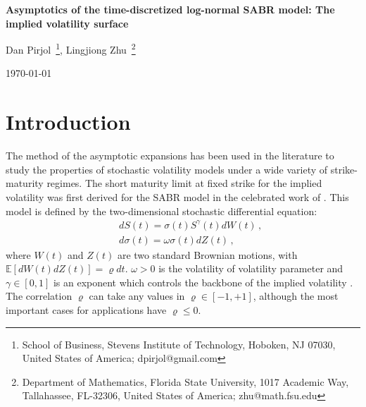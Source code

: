 \documentclass[11pt]{article}
\numberwithin{equation}{section}
\theoremstyle{plain}
\begin{document}
\begin{center}
  \Large \bf Asymptotics of the time-discretized log-normal SABR model:
The implied volatility surface
\end{center}

\author{}
\begin{center}
Dan Pirjol\,
\footnote{School of Business, Stevens Institute of Technology, Hoboken, NJ 07030, United States of America; dpirjol@gmail.com},
Lingjiong Zhu\,
\footnote{Department of Mathematics, Florida State University, 1017 Academic Way, Tallahassee, FL-32306, United States of America; zhu@math.fsu.edu}
\end{center}

\begin{center}
 \today
\end{center}

\begin{abstract}
We propose a novel time discretization for the log-normal SABR model
which is a popular stochastic volatility model that is 
widely used in financial practice. Our time discretization is a variant of the 
Euler-Maruyama scheme. We study its asymptotic
properties in the limit of a large number of time steps under a certain asymptotic regime
which includes the case of finite maturity, small vol-of-vol and large initial volatility
with fixed product of vol-of-vol and initial volatility.
We derive an almost sure limit and a large deviations result for the log-asset 
price in the limit of large number of time steps. We derive an exact
representation of the implied volatility surface for
\textit{arbitrary maturity and strike} in this regime.
Using this representation we obtain analytical expansions 
of the implied volatility for small maturity and extreme strikes,
which reproduce at leading order known asymptotic results for
the continuous time model.
\end{abstract}



\section{Introduction}
\label{sec:1}

The method of the asymptotic expansions has been used in the literature
to study the properties of stochastic volatility models under a wide
variety of strike-maturity regimes. The short maturity limit at fixed strike
for the implied volatility was first derived for the SABR model
in the celebrated work of \cite{SABR}. This model is defined by the 
two-dimensional stochastic differential equation:
\begin{eqnarray}\label{1}
&& dS(t) = \sigma(t) S^\gamma(t) dW(t)\,, \\
&& d\sigma(t) = \omega \sigma(t) dZ(t)\,, \nonumber
\end{eqnarray}
where $W(t)$ and $Z(t)$ are two standard Brownian motions, with $\mathbb{E}[dW(t)dZ(t)]=
\varrho dt$. $\omega>0$ is the volatility of volatility 
parameter and $\gamma \in [0,1]$ is an exponent which controls the backbone of 
the implied volatility \cite{SABR}. The correlation $\varrho$ can take any
values in $\varrho \in [-1,+1]$, although the most important cases for 
applications have $\varrho \leq 0$.
\end{document}
